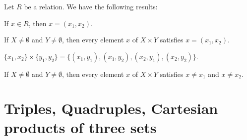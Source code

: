 \documentclass{article}
\begin{document}
Let $R$ be a relation. We have the following results:
\begin{thm}
\item\label{mcart1:21} If $x\in R$, then $x=(x_{1},x_{2})$.
\item\label{mcart1:22} If $X\neq\emptyset$ and $Y\neq\emptyset$,
  then every element $x$ of $X\times Y$ satisfies $x=(x_{1},x_{2})$.
\item\label{mcart1:23}
  $\{x_{1},x_{2}\}\times\{y_{1},y_{2}\}=\{(x_{1},y_{1}), (x_{1},y_{2}),(x_{2},y_{1}),(x_{2},y_{2})\}$.
\item\label{mcart1:24} If $X\neq\emptyset$ and $Y\neq\emptyset$,
  then every element $x$ of $X\times Y$ satisfies $x\neq x_{1}$ and
  $x\neq x_{2}$.
\end{thm}

\section{Triples, Quadruples, Cartesian products of three sets}
\end{document}
